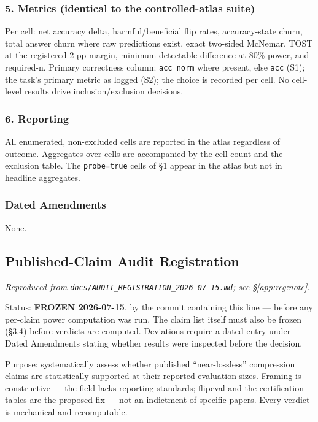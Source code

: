 \subsubsection{5. Metrics (identical to the controlled-atlas suite)}
Per cell: net accuracy delta, harmful/beneficial flip rates, accuracy-state churn, total answer churn where raw predictions exist, exact two-sided McNemar, TOST at the registered 2 pp margin, minimum detectable difference at 80\% power, and required-n. Primary correctness column: \texttt{acc\_norm} where present, else \texttt{acc} (S1); the task's primary metric as logged (S2); the choice is recorded per cell. No cell-level results drive inclusion/exclusion decisions.

\subsubsection{6. Reporting}
All enumerated, non-excluded cells are reported in the atlas regardless of outcome. Aggregates over cells are accompanied by the cell count and the exclusion table. The \texttt{probe=true} cells of \S{}1 appear in the atlas but not in headline aggregates.

\subsubsection{Dated Amendments}
None.


\subsection{Published-Claim Audit Registration}
\label{app:reg:audit}  %
\emph{Reproduced from \texttt{docs/\allowbreak{}AUDIT\_REGISTRATION\_2026-\allowbreak{}07-\allowbreak{}15.md}; see \S\ref{app:reg:note}.}  %

Status: \textbf{FROZEN 2026-07-15}, by the commit containing this line --- before any per-claim power computation was run. The claim list itself must also be frozen (\S{}3.4) before verdicts are computed. Deviations require a dated entry under Dated Amendments stating whether results were inspected before the decision.

Purpose: systematically assess whether published ``near-lossless'' compression claims are statistically supported at their reported evaluation sizes. Framing is constructive --- the field lacks reporting standards; flipeval and the certification tables are the proposed fix --- not an indictment of specific papers. Every verdict is mechanical and recomputable.

